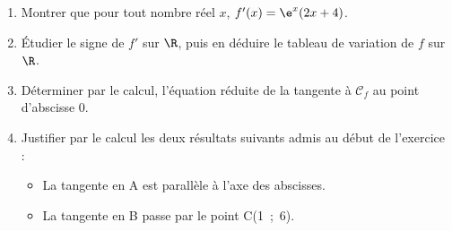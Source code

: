 \medskip

\begin{enumerate}[resume]
\item Montrer que pour tout nombre réel $x$, $f'(x)=\e^x(2x + 4)$.
\item Étudier le signe de $f'$ sur $\R$, puis en déduire le tableau de variation de $f$ sur $\R$.
\item Déterminer par le calcul, l'équation réduite de la tangente à $\mathcal{C}_f$ au point d'abscisse 0.
\item Justifier par le calcul les deux résultats suivants admis au début de l'exercice :
\begin{itemize}
\item La tangente en A est parallèle à l'axe des abscisses.
\item La tangente en B passe par le point C(1~;~6).
\end{itemize}
\end{enumerate}
